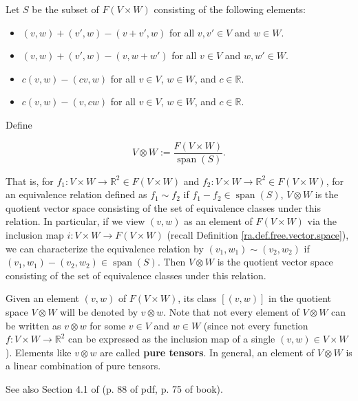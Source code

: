\begin{definition}\label{ra.def.tens.prod}

Let \(S\) be the subset of \(F(V \times W)\) consisting of the following elements:

\begin{itemize}

\item \((v,w) + (v', w) - (v+ v', w)\) for all \(v, v' \in V\) and \(w \in W\).

\item \((v,w) + (v', w) - (v, w + w')\) for all \(v  \in V\) and \(w, w' \in W\).

\item \(c(v,w) - (cv, w)\) for all \(v \in V\), \(w \in W\), and \(c \in \mathbb{R}\).

\item \(c(v,w) - (v, cw)\) for all \(v \in V\), \(w \in W\), and \(c \in \mathbb{R}\).

\end{itemize}

Define

\[
V \otimes W := \frac{F(V \times W)}{\operatorname{span}(S)}.
\]

That is, for \(f_1: V \times W \to \mathbb{R}^2 \in F( V \times W)\) and \(f_2: V \times W \to \mathbb{R}^2 \in F( V \times W)\), for an equivalence relation defined as \(f_1 \sim f_2 \) if \(f_1 - f_2 \in \operatorname{span}(S)\), \(V \otimes W\) is the quotient vector space consisting of the set of equivalence classes under this relation. In particular, if we view \((v,w)\) as an element of \(F(V \times W)\) via the inclusion map \(i: V \times W \to F(V \times W)\) (recall Definition \ref{ra.def.free.vector.space}), we can characterize the equivalence relation by \((v_1, w_1) \sim (v_2, w_2) \) if \((v_1, w_1) - (v_2, w_2) \in \operatorname{span}(S)\). Then \(V \otimes W\) is the quotient vector space consisting of the set of equivalence classes under this relation.



Given an element \((v,w)\) of \(F(V \times W)\), its class \([(v,w)]\) in the quotient space \(V \otimes W\) will be denoted by \(v \otimes w\). Note that not every element of \(V \otimes W\) can be written as \(v \otimes w\) for some \(v \in V\) and \(w \in W\) (since not every function \(f: V \times W \to \mathbb{R}^2\) can be expressed as the inclusion map of a single \((v,w) \in V \times W\)). Elements like \(v \otimes w\) are called \textbf{pure tensors}. In general, an element of \(V \otimes W\) is a linear combination of pure tensors.

See also Section 4.1 of \citet{spivak1971calculus} (p. 88 of pdf, p. 75 of book).

\end{definition}

